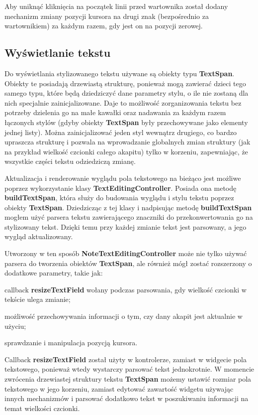 Aby uniknąć kliknięcia na początek linii przed wartownika został dodany mechanizm zmiany pozycji kursora na drugi znak (bezpośrednio za wartownikiem) za każdym razem, gdy jest on na pozycji zerowej.

\subsection{Wyświetlanie tekstu}

Do wyświetlania stylizowanego tekstu używane są obiekty typu \textbf{TextSpan}. Obiekty te posiadają drzewiastą strukturę, ponieważ mogą zawierać dzieci tego samego typu, które będą dziedziczyć dane parametry stylu, o ile nie zostaną dla nich specjalnie zainicjalizowane. Daje to możliwość zorganizowania tekstu bez potrzeby dzielenia go na małe kawałki oraz nadawania za każdym razem łączonych stylów (gdyby obiekty \textbf{TextSpan} były przechowywane jako elementy jednej listy). Można zainicjalizować jeden styl wewnątrz drugiego, co bardzo upraszcza strukturę i pozwala na wprowadzanie globalnych zmian struktury (jak na przykład wielkość czcionki całego akapitu) tylko w korzeniu, zapewniając, że wszystkie części tekstu odziedziczą zmianę.

Aktualizacja i renderowanie wyglądu pola tekstowego na bieżąco jest możliwe poprzez wykorzystanie klasy \textbf{TextEditingController}. Posiada ona metodę \textbf{buildTextSpan}, która służy do budowania wyglądu i stylu tekstu poprzez obiekty \textbf{TextSpan}. Dziedzicząc z tej klasy i nadpisując metodę \textbf{buildTextSpan} mogłem użyć parsera tekstu zawierającego znaczniki do przekonwertowania go na stylizowany tekst.
Dzięki temu przy każdej zmianie tekst jest parsowany, a jego wygląd aktualizowany.

Utworzony w ten sposób \textbf{NoteTextEditingController} może nie tylko używać parsera do tworzenia obiektów \textbf{TextSpan}, ale również mógł zostać rozszerzony o dodatkowe parametry, takie jak:

\begin{compactitem}
    \item callback \textbf{resizeTextField} wołany podczas parsowania, gdy wielkość czcionki w tekście ulega zmianie;
    \item możliwość przechowywania informacji o tym, czy dany akapit jest aktualnie w użyciu;
    \item sprawdzanie i manipulacja pozycją kursora.
\end{compactitem}

Callback \textbf{resizeTextField} został użyty w kontrolerze, zamiast w widgecie pola tekstowego, ponieważ wtedy wystarczy parsować tekst jednokrotnie. W momencie zwrócenia drzewiastej struktury tekstu \textbf{TextSpan} możemy ustawić rozmiar pola tekstowego w jego korzeniu, zamiast edytować zawartość widgetu używając innych mechanizmów i parsować dodatkowo tekst w poszukiwaniu informacji na temat wielkości czcionki.

